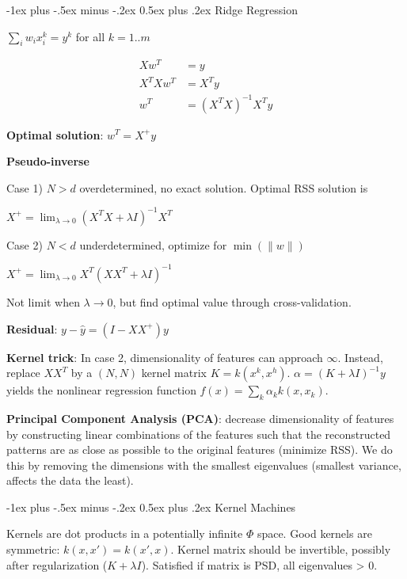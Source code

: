 \documentclass[10pt,landscape]{article}
\makeatletter
\renewcommand{\section}{\@startsection{section}{1}{0mm}%
                                {-1ex plus -.5ex minus -.2ex}%
                                {0.5ex plus .2ex}%
                                {\normalfont\large\bfseries}}
\makeatother
\begin{document}
\begin{multicols}{3}
\section{Ridge Regression}

$\sum_i w_i x^k_i = y^k$ for all $k=1..m$

\begin{align*}
Xw^T &= y \\
X^T X w^T &= X^T y \\
w^T &= (X^T X)^{-1} X^T y
\end{align*}

\textbf{Optimal solution}: $w^T = X^+ y$

\textbf{Pseudo-inverse}

Case 1) $N > d$ overdetermined, no exact solution. Optimal RSS solution is

$X^+ = \lim_{\lambda \rightarrow 0} (X^T X + \lambda I)^{-1} X^T$

Case 2) $N < d$ underdetermined, optimize for $\min(\lVert w \rVert)$

$X^+ = \lim_{\lambda \rightarrow 0} X^T(XX^T + \lambda I)^{-1}$

Not limit when $\lambda \rightarrow 0$, but find optimal value through cross-validation.

\textbf{Residual}: $y-\hat{y} = (I-XX^+)y$

\textbf{Kernel trick}: In case 2, dimensionality of features can approach $\infty$. Instead, replace $XX^T$ by a $(N, N)$ kernel matrix $K = k(x^k, x^h)$. $\alpha = (K + \lambda I)^{-1} y$ yields the nonlinear regression function $f(x) = \sum_k \alpha_k k(x, x_k)$.

\textbf{Principal Component Analysis (PCA)}: decrease dimensionality of features by constructing linear combinations of the features such that the reconstructed patterns are as close as possible to the original features (minimize RSS). We do this by removing the dimensions with the smallest eigenvalues (smallest variance, affects the data the least).

\section{Kernel Machines}

Kernels are dot products in a potentially infinite $\Phi$ space.
Good kernels are symmetric: $k(x, x') = k(x', x)$.
Kernel matrix should be invertible, possibly after regularization ($K+\lambda I$). Satisfied if matrix is PSD, all eigenvalues > 0.


\end{multicols}
\end{document}
